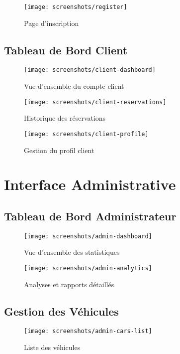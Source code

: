 \documentclass[12pt,a4paper]{report}
\begin{document}
\begin{figure}[H]
    \centering
    \texttt{[image: screenshots/register]}
    \caption{Page d'inscription}
\end{figure}

\subsection{Tableau de Bord Client}
\begin{figure}[H]
    \centering
    \texttt{[image: screenshots/client-dashboard]}
    \caption{Vue d'ensemble du compte client}
\end{figure}

\begin{figure}[H]
    \centering
    \texttt{[image: screenshots/client-reservations]}
    \caption{Historique des réservations}
\end{figure}

\begin{figure}[H]
    \centering
    \texttt{[image: screenshots/client-profile]}
    \caption{Gestion du profil client}
\end{figure}

\section{Interface Administrative}

\subsection{Tableau de Bord Administrateur}
\begin{figure}[H]
    \centering
    \texttt{[image: screenshots/admin-dashboard]}
    \caption{Vue d'ensemble des statistiques}
\end{figure}

\begin{figure}[H]
    \centering
    \texttt{[image: screenshots/admin-analytics]}
    \caption{Analyses et rapports détaillés}
\end{figure}

\subsection{Gestion des Véhicules}
\begin{figure}[H]
    \centering
    \texttt{[image: screenshots/admin-cars-list]}
    \caption{Liste des véhicules}
\end{figure}
\end{document}
